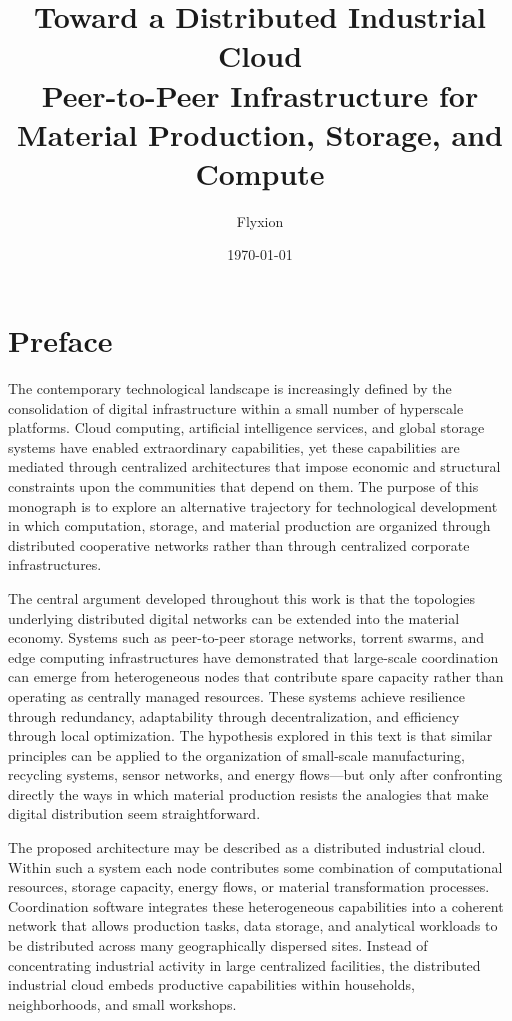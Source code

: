 \documentclass[12pt]{book}
\title{Toward a Distributed Industrial Cloud \\[0.5em]
       \large Peer-to-Peer Infrastructure for Material Production,
       Storage, and Compute}
\author{Flyxion}
\date{\today}
\theoremstyle{definition}
\theoremstyle{remark}
\begin{document}
\frontmatter

\maketitle

\tableofcontents

\chapter*{Preface}

The contemporary technological landscape is increasingly defined by
the consolidation of digital infrastructure within a small number of
hyperscale platforms. Cloud computing, artificial intelligence
services, and global storage systems have enabled extraordinary
capabilities, yet these capabilities are mediated through centralized
architectures that impose economic and structural constraints upon the
communities that depend on them. The purpose of this monograph is to
explore an alternative trajectory for technological development in
which computation, storage, and material production are organized
through distributed cooperative networks rather than through
centralized corporate infrastructures.

The central argument developed throughout this work is that the
topologies underlying distributed digital networks can be extended
into the material economy. Systems such as peer-to-peer storage
networks, torrent swarms, and edge computing infrastructures have
demonstrated that large-scale coordination can emerge from
heterogeneous nodes that contribute spare capacity rather than
operating as centrally managed resources. These systems achieve
resilience through redundancy, adaptability through decentralization,
and efficiency through local optimization. The hypothesis explored in
this text is that similar principles can be applied to the
organization of small-scale manufacturing, recycling systems, sensor
networks, and energy flows---but only after confronting directly the
ways in which material production resists the analogies that make
digital distribution seem straightforward.

The proposed architecture may be described as a distributed
industrial cloud. Within such a system each node contributes some
combination of computational resources, storage capacity, energy
flows, or material transformation processes. Coordination software
integrates these heterogeneous capabilities into a coherent network
that allows production tasks, data storage, and analytical workloads
to be distributed across many geographically dispersed sites. Instead
of concentrating industrial activity in large centralized facilities,
the distributed industrial cloud embeds productive capabilities within
households, neighborhoods, and small workshops.
\end{document}

